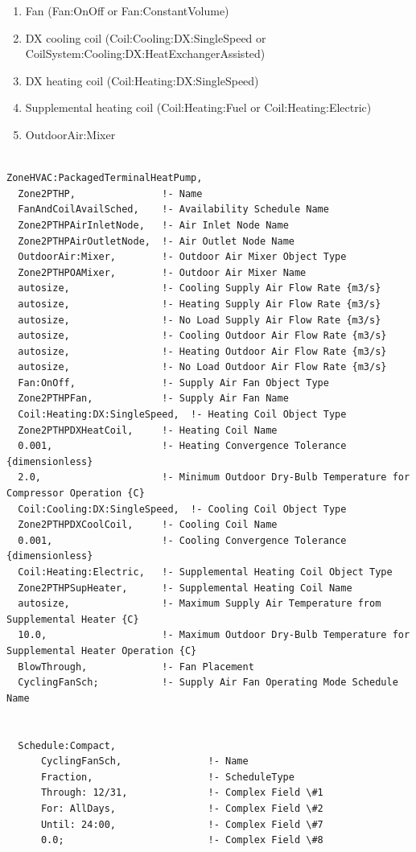 \begin{enumerate}
\def\labelenumi{\arabic{enumi})}
\item
  Fan (Fan:OnOff or Fan:ConstantVolume)
\item
  DX cooling coil (Coil:Cooling:DX:SingleSpeed or CoilSystem:Cooling:DX:HeatExchangerAssisted)
\item
  DX heating coil (Coil:Heating:DX:SingleSpeed)
\item
  Supplemental heating coil (Coil:Heating:Fuel or Coil:Heating:Electric)
\item
  OutdoorAir:Mixer
\end{enumerate}

\begin{lstlisting}

ZoneHVAC:PackagedTerminalHeatPump,
  Zone2PTHP,               !- Name
  FanAndCoilAvailSched,    !- Availability Schedule Name
  Zone2PTHPAirInletNode,   !- Air Inlet Node Name
  Zone2PTHPAirOutletNode,  !- Air Outlet Node Name
  OutdoorAir:Mixer,        !- Outdoor Air Mixer Object Type
  Zone2PTHPOAMixer,        !- Outdoor Air Mixer Name
  autosize,                !- Cooling Supply Air Flow Rate {m3/s}
  autosize,                !- Heating Supply Air Flow Rate {m3/s}
  autosize,                !- No Load Supply Air Flow Rate {m3/s}
  autosize,                !- Cooling Outdoor Air Flow Rate {m3/s}
  autosize,                !- Heating Outdoor Air Flow Rate {m3/s}
  autosize,                !- No Load Outdoor Air Flow Rate {m3/s}
  Fan:OnOff,               !- Supply Air Fan Object Type
  Zone2PTHPFan,            !- Supply Air Fan Name
  Coil:Heating:DX:SingleSpeed,  !- Heating Coil Object Type
  Zone2PTHPDXHeatCoil,     !- Heating Coil Name
  0.001,                   !- Heating Convergence Tolerance {dimensionless}
  2.0,                     !- Minimum Outdoor Dry-Bulb Temperature for Compressor Operation {C}
  Coil:Cooling:DX:SingleSpeed,  !- Cooling Coil Object Type
  Zone2PTHPDXCoolCoil,     !- Cooling Coil Name
  0.001,                   !- Cooling Convergence Tolerance {dimensionless}
  Coil:Heating:Electric,   !- Supplemental Heating Coil Object Type
  Zone2PTHPSupHeater,      !- Supplemental Heating Coil Name
  autosize,                !- Maximum Supply Air Temperature from Supplemental Heater {C}
  10.0,                    !- Maximum Outdoor Dry-Bulb Temperature for Supplemental Heater Operation {C}
  BlowThrough,             !- Fan Placement
  CyclingFanSch;           !- Supply Air Fan Operating Mode Schedule Name


  Schedule:Compact,
      CyclingFanSch,               !- Name
      Fraction,                    !- ScheduleType
      Through: 12/31,              !- Complex Field \#1
      For: AllDays,                !- Complex Field \#2
      Until: 24:00,                !- Complex Field \#7
      0.0;                         !- Complex Field \#8


\end{lstlisting}
